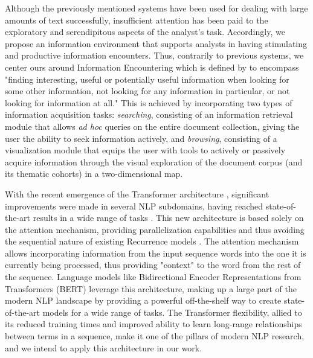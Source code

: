 \documentclass[a4paper]{article}
\begin{document}
Although the previously mentioned systems have been used for dealing with large amounts of text successfully, insufficient attention has been paid to the exploratory and serendipitous aspects of the analyst's task. Accordingly, we propose an information environment that supports analysts in having stimulating and productive information encounters. Thus, contrarily to previous systems, we center ours around Information Encountering which is defined by \citet{erdelez2020} to encompass "finding interesting, useful or potentially useful information when looking for some other information, not looking for any information in particular, or not looking for information at all." This is achieved by incorporating two types of information acquisition tasks: \emph{searching}, consisting of an information retrieval module that allows \emph{ad hoc} queries on the entire document collection, giving the user the ability to seek information actively, and \emph{browsing}, consisting of a visualization module that equips the user with tools to actively or passively acquire information through the visual exploration of the document corpus (and its thematic cohorts) in a two-dimensional map.

With the recent emergence of the Transformer architecture \citep{vaswani2017}, significant improvements were made in several NLP subdomains, having reached state-of-the-art results in a wide range of tasks \citep{vaswani2017}. This new architecture is based solely on the attention mechanism, providing parallelization capabilities and thus avoiding the sequential nature of existing Recurrence models \citep{hochreiter1997, cho2014}. The attention mechanism allows incorporating information from the input sequence words into the one it is currently being processed, thus providing "context" to the word from the rest of the sequence. Language models like Bidirectional Encoder Representations from Transformers (BERT) \citep{devlin2019} leverage this architecture, making up a large part of the modern NLP landscape by providing a powerful off-the-shelf way to create state-of-the-art models for a wide range of tasks. The Transformer flexibility, allied to its reduced training times and improved ability to learn long-range relationships between terms in a sequence, make it one of the pillars of modern NLP research, and we intend to apply this architecture in our work.
\end{document}
